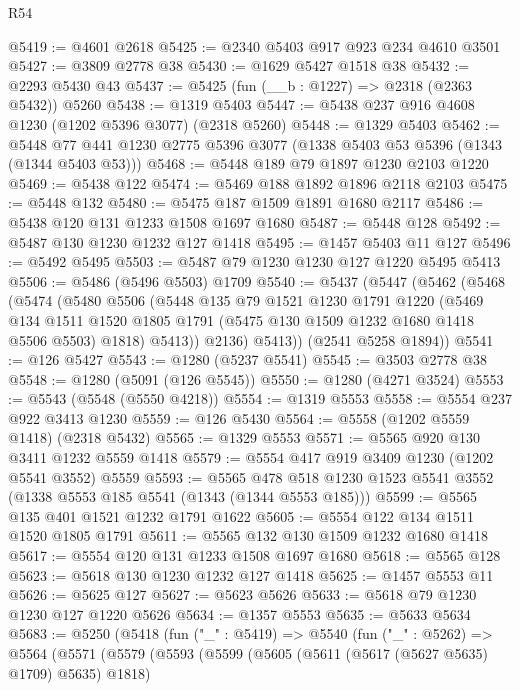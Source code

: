 \begin{lexlean}{R54}
\begin{coremodule}
@5419 := @4601 @2618
@5425 := @2340 @5403 @917 @923 @234 @4610 @3501
@5427 := @3809 @2778 @38
@5430 := @1629 @5427 @1518 @38
@5432 := @2293 @5430 @43
@5437 := @5425 (fun (__b : @1227) => @2318 (@2363 @5432)) @5260
@5438 := @1319 @5403
@5447 := @5438 @237 @916 @4608 @1230 (@1202 @5396 @3077) (@2318 @5260)
@5448 := @1329 @5403
@5462 := @5448 @77 @441 @1230 @2775 @5396 @3077 (@1338 @5403 @53 @5396 (@1343 (@1344 @5403 @53)))
@5468 := @5448 @189 @79 @1897 @1230 @2103 @1220
@5469 := @5438 @122
@5474 := @5469 @188 @1892 @1896 @2118 @2103
@5475 := @5448 @132
@5480 := @5475 @187 @1509 @1891 @1680 @2117
@5486 := @5438 @120 @131 @1233 @1508 @1697 @1680
@5487 := @5448 @128
@5492 := @5487 @130 @1230 @1232 @127 @1418
@5495 := @1457 @5403 @11 @127
@5496 := @5492 @5495
@5503 := @5487 @79 @1230 @1230 @127 @1220 @5495 @5413
@5506 := @5486 (@5496 @5503) @1709
@5540 := @5437
    (@5447
      (@5462
        (@5468
          (@5474
            (@5480
              @5506
              (@5448
                @135
                @79
                @1521
                @1230
                @1791
                @1220
                (@5469
                  @134
                  @1511
                  @1520
                  @1805
                  @1791
                  (@5475 @130 @1509 @1232 @1680 @1418 @5506 @5503)
                  @1818)
                @5413))
            @2136)
          @5413))
      (@2541 @5258 @1894))
@5541 := @126 @5427
@5543 := @1280 (@5237 @5541)
@5545 := @3503 @2778 @38
@5548 := @1280 (@5091 (@126 @5545))
@5550 := @1280 (@4271 @3524)
@5553 := @5543 (@5548 (@5550 @4218))
@5554 := @1319 @5553
@5558 := @5554 @237 @922 @3413 @1230
@5559 := @126 @5430
@5564 := @5558 (@1202 @5559 @1418) (@2318 @5432)
@5565 := @1329 @5553
@5571 := @5565 @920 @130 @3411 @1232 @5559 @1418
@5579 := @5554 @417 @919 @3409 @1230 (@1202 @5541 @3552) @5559
@5593 := @5565 @478 @518 @1230 @1523 @5541 @3552 (@1338 @5553 @185 @5541 (@1343 (@1344 @5553 @185)))
@5599 := @5565 @135 @401 @1521 @1232 @1791 @1622
@5605 := @5554 @122 @134 @1511 @1520 @1805 @1791
@5611 := @5565 @132 @130 @1509 @1232 @1680 @1418
@5617 := @5554 @120 @131 @1233 @1508 @1697 @1680
@5618 := @5565 @128
@5623 := @5618 @130 @1230 @1232 @127 @1418
@5625 := @1457 @5553 @11
@5626 := @5625 @127
@5627 := @5623 @5626
@5633 := @5618 @79 @1230 @1230 @127 @1220 @5626
@5634 := @1357 @5553
@5635 := @5633 @5634
@5683 := @5250
    (@5418
      (fun ("_" : @5419) =>
      @5540
        (fun ("_" : @5262) =>
        @5564
          (@5571
            (@5579
              (@5593
                (@5599
                  (@5605 (@5611 (@5617 (@5627 @5635) @1709) @5635) @1818)

\end{coremodule}
\end{lexlean}
